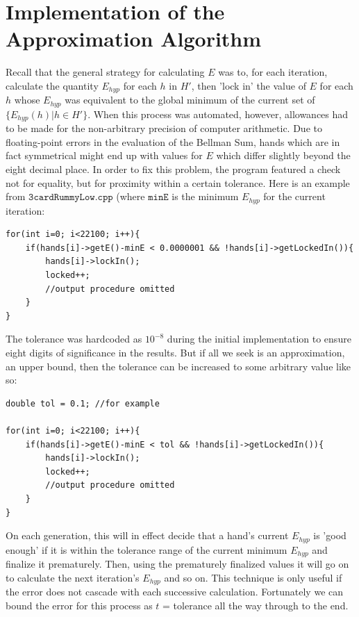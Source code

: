 \documentclass[paper=a4, fontsize=11pt,twoside]{report}   %
\begin{document}
\section{Implementation of the Approximation Algorithm}

Recall that the general strategy for calculating $E$ was to, for each iteration, calculate the quantity $E_{hyp}$ for each $h$ in $H'$, then 'lock in' the value of $E$ for each $h$ whose $E_{hyp}$ was equivalent to the global minimum of the current set of $\{E_{hyp}(h) | h \in H' \}$. When this process was automated, however, allowances had to be made for the non-arbitrary precision of computer arithmetic. Due to floating-point errors in the evaluation of the Bellman Sum, hands which are in fact symmetrical might end up with values for $E$ which differ slightly beyond the eight decimal place. In order to fix this problem, the program featured a check not for equality, but for proximity within a certain tolerance.  Here is an example from $\texttt{3cardRummyLow.cpp}$ (where $\texttt{minE}$ is the minimum $E_{hyp}$ for the current iteration:

\singlespacing
\begin{verbatim}
for(int i=0; i<22100; i++){
    if(hands[i]->getE()-minE < 0.0000001 && !hands[i]->getLockedIn()){
        hands[i]->lockIn();
        locked++;
        //output procedure omitted
    }
}
\end{verbatim}
\doublespacing
The tolerance was hardcoded as $10^{-8}$ during the initial implementation to ensure eight digits of significance in the results. But if all we seek is an approximation, an upper bound, then the tolerance can be increased to some arbitrary value like so:

\singlespacing
\begin{verbatim}
double tol = 0.1; //for example

for(int i=0; i<22100; i++){
    if(hands[i]->getE()-minE < tol && !hands[i]->getLockedIn()){
        hands[i]->lockIn();
        locked++;
        //output procedure omitted
    }
}
\end{verbatim}
\doublespacing

On each generation, this will in effect decide that a hand's current $E_{hyp}$ is 'good enough' if it is within the tolerance range of the current minimum $E_{hyp}$ and finalize it prematurely. Then, using the prematurely finalized values it will go on to calculate the next iteration's $E_{hyp}$ and so on. This technique is only useful if the error does not cascade with each successive calculation. Fortunately we can bound the error for this process as $t$ = tolerance all the way through to the end.
\end{document}
